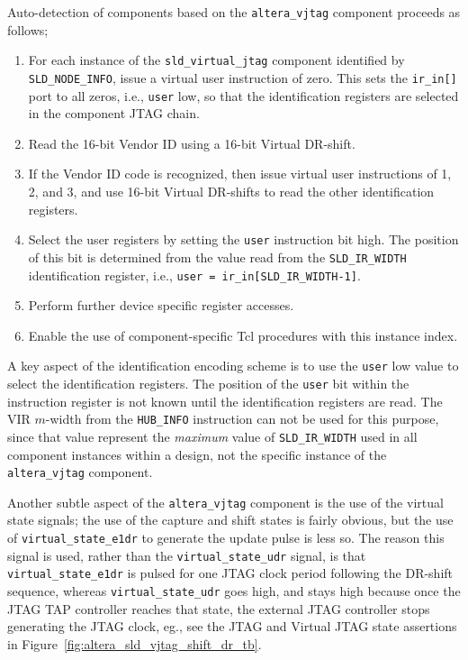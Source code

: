\documentclass[10pt,twoside]{article}
\begin{document}
Auto-detection of components based on the \verb+altera_vjtag+ component
proceeds as follows;
%
\begin{enumerate}
\item For each instance of the \verb+sld_virtual_jtag+ component identified
by \verb+SLD_NODE_INFO+, issue a virtual user instruction of zero.
This sets the \verb+ir_in[]+ port to all zeros, i.e., \verb+user+ low,
so that the identification registers are selected in the component JTAG chain.
\item Read the 16-bit Vendor ID using a 16-bit Virtual DR-shift.
\item If the Vendor ID code is recognized, then issue virtual user
instructions of 1, 2, and 3, and use 16-bit Virtual DR-shifts to read
the other identification registers.
\item Select the user registers by setting the \verb+user+ instruction bit 
high. The position of this bit is determined from the value read from
the \verb+SLD_IR_WIDTH+ identification register, i.e.,\newline
\verb+user = ir_in[SLD_IR_WIDTH-1]+.
\item Perform further device specific register accesses.
\item Enable the use of component-specific Tcl procedures with this
instance index.
\end{enumerate}
%
A key aspect of the identification encoding scheme is to use the
\verb+user+ low value to select the identification registers.
The position of the \verb+user+ bit within the instruction register
is not known until the identification registers are read.
The VIR $m$-width from the \verb+HUB_INFO+ instruction can not
be used for this purpose, since that value represent the
{\em maximum} value of \verb+SLD_IR_WIDTH+ used in all component
instances within a design, not the specific instance of the
\verb+altera_vjtag+ component.

Another subtle aspect of the \verb+altera_vjtag+ component is the
use of the virtual state signals; the use of the capture and shift
states is fairly obvious, but the use of \verb+virtual_state_e1dr+
to generate the update pulse is less so. The reason this signal
is used, rather than the \verb+virtual_state_udr+ signal, is that
\verb+virtual_state_e1dr+ is pulsed for one JTAG clock period 
following the DR-shift sequence, whereas \verb+virtual_state_udr+ 
goes high, and stays high because once the JTAG TAP controller
reaches that state, the external JTAG controller stops generating
the JTAG clock, eg., see the JTAG and Virtual JTAG state
assertions in Figure~\ref{fig:altera_sld_vjtag_shift_dr_tb}.
\end{document}
